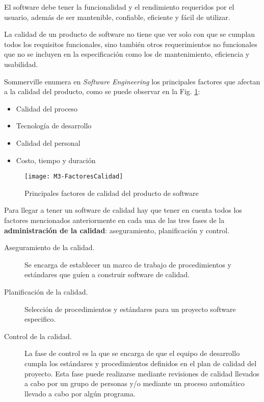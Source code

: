 El software debe tener la funcionalidad y el rendimiento requeridos por el usuario, además de ser mantenible, confiable, eficiente y fácil de utilizar.

La calidad de un producto de software no tiene que ver solo con que se cumplan todos los requisitos funcionales, sino también otros requerimientos no funcionales que no se incluyen en la especificación como los de mantenimiento, eficiencia y usabilidad.

Sommerville enumera en \textit{Software Engineering} \citep{sommerville_ingenierisoftware_2002} los principales factores que afectan a la calidad del producto, como se puede observar en la Fig. \ref{fig:M3-FactoresCalidad}:
\begin{itemize}
	\tightlist
	\item Calidad del proceso
	\item Tecnología de desarrollo
	\item Calidad del personal
	\item Costo, tiempo y duración
\end{itemize}
\begin{figure}[!h]
	\centering
	\texttt{[image: M3-FactoresCalidad]}
	\caption{Principales factores de calidad del producto de software \citep{sommerville_ingenierisoftware_2002}}\label{fig:M3-FactoresCalidad}
\end{figure}
\FloatBarrier


Para llegar a tener un software de calidad hay que tener en cuenta todos los factores mencionados anteriormente en cada una de las tres fases de la \textbf{administración de la calidad}: aseguramiento, planificación y control.

\begin{description}
	\item[Aseguramiento de la calidad.] Se encarga de establecer un marco de trabajo de procedimientos y estándares que guíen a construir software de calidad.
	\item[Planificación de la calidad.] Selección de procedimientos y estándares para un proyecto software especifico.
	\item[Control de la calidad.] La fase de control es la que se encarga de que el equipo de desarrollo cumpla los estándares y procedimientos definidos en el plan de calidad del proyecto. Esta fase puede realizarse mediante revisiones de calidad llevados a cabo por un grupo de personas y/o mediante un proceso automático llevado a cabo por algún programa.
\end{description}

